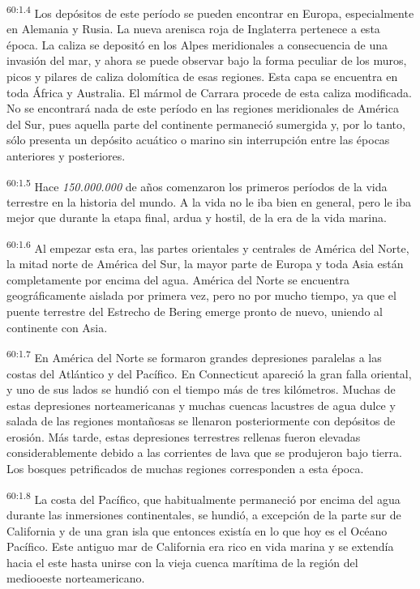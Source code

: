 \par
\textsuperscript{60:1.4} Los depósitos de este período se pueden encontrar en Europa, especialmente en Alemania y Rusia. La nueva arenisca roja de Inglaterra pertenece a esta época. La caliza se depositó en los Alpes meridionales a consecuencia de una invasión del mar, y ahora se puede observar bajo la forma peculiar de los muros, picos y pilares de caliza dolomítica de esas regiones. Esta capa se encuentra en toda África y Australia. El mármol de Carrara procede de esta caliza modificada. No se encontrará nada de este período en las regiones meridionales de América del Sur, pues aquella parte del continente permaneció sumergida y, por lo tanto, sólo presenta un depósito acuático o marino sin interrupción entre las épocas anteriores y posteriores.

\par
\textsuperscript{60:1.5} Hace \textit{150.000.000} de años comenzaron los primeros períodos de la vida terrestre en la historia del mundo. A la vida no le iba bien en general, pero le iba mejor que durante la etapa final, ardua y hostil, de la era de la vida marina.

\par
\textsuperscript{60:1.6} Al empezar esta era, las partes orientales y centrales de América del Norte, la mitad norte de América del Sur, la mayor parte de Europa y toda Asia están completamente por encima del agua. América del Norte se encuentra geográficamente aislada por primera vez, pero no por mucho tiempo, ya que el puente terrestre del Estrecho de Bering emerge pronto de nuevo, uniendo al continente con Asia.

\par
\textsuperscript{60:1.7} En América del Norte se formaron grandes depresiones paralelas a las costas del Atlántico y del Pacífico. En Connecticut apareció la gran falla oriental, y uno de sus lados se hundió con el tiempo más de tres kilómetros. Muchas de estas depresiones norteamericanas y muchas cuencas lacustres de agua dulce y salada de las regiones montañosas se llenaron posteriormente con depósitos de erosión. Más tarde, estas depresiones terrestres rellenas fueron elevadas considerablemente debido a las corrientes de lava que se produjeron bajo tierra. Los bosques petrificados de muchas regiones corresponden a esta época.

\par
\textsuperscript{60:1.8} La costa del Pacífico, que habitualmente permaneció por encima del agua durante las inmersiones continentales, se hundió, a excepción de la parte sur de California y de una gran isla que entonces existía en lo que hoy es el Océano Pacífico. Este antiguo mar de California era rico en vida marina y se extendía hacia el este hasta unirse con la vieja cuenca marítima de la región del mediooeste norteamericano.

